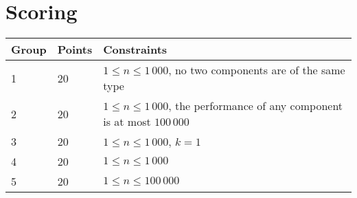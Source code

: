 \section*{Scoring}
\begin{tabular}{|l|l|l|}
\hline
Group & Points & Constraints \\ \hline
1     & 20   & $1 \leq n \leq 1\,000$, no two components are of the same type \\ \hline
2     & 20   & $1 \leq n \leq 1\,000$, the performance of any component is at most $100\,000$ \\ \hline
3     & 20   & $1 \leq n \leq 1\,000$, $k = 1$ \\ \hline
4     & 20   & $1 \leq n \leq 1\,000$ \\ \hline
5     & 20   & $1 \leq n \leq 100\,000$ \\ \hline
\end{tabular}

